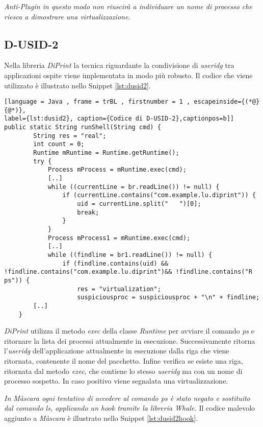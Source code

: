 \emph{Anti-Plugin in questo modo non riuscirà a individuare un nome di processo che riesca a dimostrare una virtualizzazione.}

\subsection*{D-USID-2}
\label{d-usid-2}

Nella libreria \emph{DiPrint} la tecnica riguardante la condivisione di \emph{\gls{useridg}} tra applicazioni ospite viene implementata in modo più robusto.
Il codice che viene utilizzato è illustrato nello Snippet \ref{lst:dusid2}.

\begin{lstlisting}[language = Java , frame = trBL , firstnumber = 1 , escapeinside={(*@}{@*)},
label={lst:dusid2}, caption={Codice di D-USID-2},captionpos=b]]
public static String runShell(String cmd) {
        String res = "real";
        int count = 0;
        Runtime mRuntime = Runtime.getRuntime();
        try {
            Process mProcess = mRuntime.exec(cmd);
            [..]
            while ((currentLine = br.readLine()) != null) {
                if (currentLine.contains("com.example.lu.diprint")) {
                    uid = currentLine.split("   ")[0];
                    break;
                }
            }
            Process mProcess1 = mRuntime.exec(cmd);
            [..]
            while ((findline = br1.readLine()) != null) {
                if (findline.contains(uid) && !findline.contains("com.example.lu.diprint")&& !findline.contains("R ps")) {
                    res = "virtualization";
                    suspiciousproc = suspiciousproc + "\n" + findline;
        [..]
    }

\end{lstlisting}

\emph{DiPrint} utilizza il metodo \emph{exec} della classe \emph{Runtime} per avviare il comando \emph{ps} e ritornare la lista dei processi attualmente in esecuzione. 
Successivamente ritorna l'\emph{\gls{useridg}} dell'applicazione attualmente in esecuzione dalla riga che viene ritornata, contenente il nome del pacchetto. Infine verifica se esiste una riga, ritornata dal metodo \emph{exec}, che contiene lo stesso \emph{\gls{useridg}} ma con un nome di processo sospetto.
In caso positivo viene segnalata una virtualizzazione.

\emph{In Màscara ogni tentativo di accedere al comando ps è stato negato e sostituito dal comando ls, applicando un hook tramite la libreria Whale.}
Il codice malevolo aggiunto a \emph{Màscara} è illustrato nello Snippet \ref{lst:dusid2hook}.

